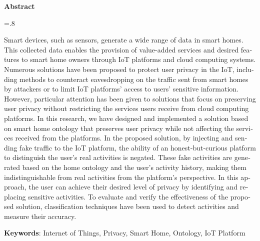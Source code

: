 \pagestyle{empty}
\begin{latin}
\begin{center}
\textbf{Abstract}
\end{center}
\baselineskip=.8\baselineskip

Smart devices, such as sensors, generate a wide range of data in smart homes. This collected data enables the provision of value-added services and desired features to smart home owners through IoT platforms and cloud computing systems. Numerous solutions have been proposed to protect user privacy in the IoT, including methods to counteract eavesdropping on the traffic sent from smart homes by attackers or to limit IoT platforms' access to users' sensitive information. However, particular attention has been given to solutions that focus on preserving user privacy without restricting the services users receive from cloud computing platforms. In this research, we have designed and implemented a solution based on smart home ontology that preserves user privacy while not affecting the services received from the platforms. In the proposed solution, by injecting and sending fake traffic to the IoT platform, the ability of an honest-but-curious platform to distinguish the user's real activities is negated. These fake activities are generated based on the home ontology and the user's activity history, making them indistinguishable from real activities from the platform's perspective. In this approach, the user can achieve their desired level of privacy by identifying and replacing sensitive activities. To evaluate and verify the effectiveness of the proposed solution, classification techniques have been used to detect activities and measure their accuracy.

\bigskip\noindent\textbf{Keywords}: Internet of Things, Privacy, Smart Home, Ontology, IoT Platform

\end{latin}
